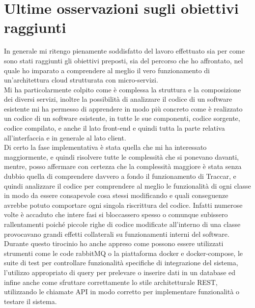 \documentclass[a4paper,titlepage,12pt]{report}
\begin{document}
{\section{
Ultime osservazioni sugli obiettivi raggiunti}
In generale mi ritengo pienamente soddisfatto del lavoro effettuato sia per come sono stati raggiunti gli obiettivi preposti, sia del percorso che ho affrontato, nel quale ho imparato a comprendere al meglio il vero funzionamento di un'architettura cloud strutturata con micro-servizi.\\
Mi ha particolarmente colpito come è complessa la struttura e la composizione dei diversi servizi, inoltre la possibilità di analizzare il codice di un software esistente mi ha permesso di apprendere in modo più concreto come è realizzato un codice di un software esistente, in tutte le sue componenti, codice sorgente, codice compilato, e anche il lato front-end e quindi tutta la parte relativa all'interfaccia e in generale al lato client.\\
Di certo la fase implementativa è stata quella che mi ha interessato maggiormente, e quindi risolvere tutte le complessità che si ponevano davanti, mentre, posso affermare con certezza che la complessità maggiore è stata senza dubbio quella di comprendere davvero a fondo il funzionamento di Traccar, e quindi analizzare il codice per comprendere al meglio le funzionalità di ogni classe in modo da essere consapevole cosa stessi modificando e quali conseguenze avrebbe potuto comportare ogni singola riscrittura del codice. Infatti numerose volte è accaduto che intere fasi si bloccassero spesso o comunque subissero rallentamenti poiché piccole righe di codice modificate all'interno di una classe provocavano grandi effetti collaterali su funzionamenti interni del software.\\
Durante questo tirocinio ho anche appreso come possono essere utilizzati strumenti come le code rabbitMQ o la piattaforma docker e docker-compose, le suite di test per controllare funzionalità specifiche di integrazione del sistema, l'utilizzo appropriato di query per prelevare o inserire dati in un database ed infine anche come sfruttare correttamente lo stile architetturale REST, utilizzando le chiamate API in modo corretto per implementare funzionalità o testare il sistema.

}
\end{document}

